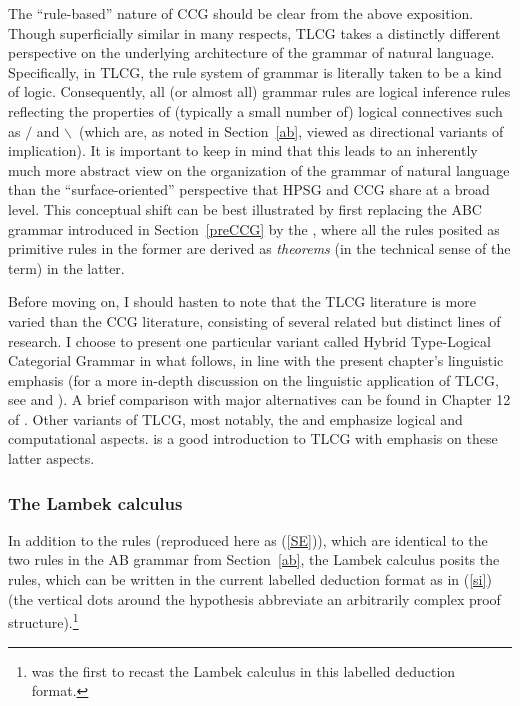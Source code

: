 \documentclass[output=paper
                ,modfonts
                ,nonflat
	        ,collection
	        ,collectionchapter
	        ,collectiontoclongg
 	        ,biblatex
                ,babelshorthands
                ,newtxmath
                ,draftmode
                ,colorlinks, citecolor=brown
]{./langsci/langscibook}
\begin{document}
The ``rule-based'' nature of CCG should be clear from the above
exposition. Though superficially similar in many respects,
TLCG takes a distinctly different perspective on the
underlying architecture of the grammar of natural language.
Specifically, in TLCG, the rule system of grammar is literally taken
to be a kind of logic. Consequently, all (or almost all) grammar rules are logical
inference rules reflecting the properties of (typically a small number
of) logical connectives such as \ensuremath{/} and
\ensuremath{\backslash}\ (which are, as noted in Section~\ref{ab}, viewed as
directional variants of implication).
It is important to keep in mind that this leads to
an inherently much more abstract view on the
organization of the grammar of natural language than the
``surface-oriented'' perspective that HPSG and CCG share
at a broad level. This conceptual shift can be
best illustrated by first replacing the ABC grammar introduced in
Section~\ref{preCCG} by the , where all the rules
posited as primitive rules in the former are derived as \emph{theorems} (in
the technical sense of the term) in the latter.

Before moving on, I should hasten to note that the TLCG literature is
more varied than the CCG literature, consisting of several related but
distinct lines of research. I choose to present one particular variant
called Hybrid Type-Logical Categorial Grammar \citep{KubotaLevineBook}
in what follows, in line with the present chapter's linguistic
emphasis (for a more in-depth discussion on the linguistic application
of TLCG, see \citealt{Carpenter98a-u} and \citealt{KubotaLevineBook}).
A brief comparison with major alternatives
can be found in Chapter 12 of \citet{KubotaLevineBook}. 
Other variants of TLCG, most notably, the
 \citep{Moortgat2011a-u} and
 \citep{morrill2011} emphasize logical
and computational aspects. \citet{mootretore2012} is a good
introduction to TLCG with emphasis on these latter aspects.


\subsubsection{The Lambek calculus \label{lambek}}

In addition to the  rules (reproduced here as
(\ref{SE})), which are identical to the two rules in the AB grammar
from Section~\ref{ab}, the Lambek calculus posits the  rules, which can be written in the current labelled
deduction format as in (\ref{si}) (the vertical dots around the
hypothesis abbreviate an arbitrarily complex proof
structure).\footnote{\citet{Morrill94a-u} was
the first to recast the Lambek calculus in this labelled deduction
format.}
\end{document}
